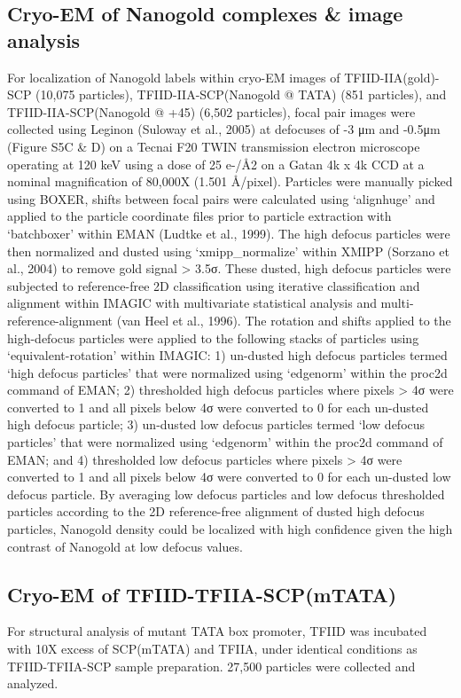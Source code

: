 \subsection{Cryo-EM of Nanogold complexes \& image analysis} 
For localization of Nanogold labels within cryo-EM images of TFIID-IIA(gold)-SCP (10,075 particles), TFIID-IIA-SCP(Nanogold @ TATA) (851 particles), and TFIID-IIA-SCP(Nanogold @ +45) (6,502 particles), focal pair images were collected using Leginon (Suloway et al., 2005) at defocuses of -3 μm and -0.5μm (Figure S5C & D) on a Tecnai F20 TWIN transmission electron microscope operating at 120 keV using a dose of 25 e-/Å2 on a Gatan 4k x 4k CCD at a nominal magnification of 80,000X (1.501 Å/pixel).  Particles were manually picked using BOXER, shifts between focal pairs were calculated using ‘alignhuge’ and applied to the particle coordinate files prior to particle extraction with ‘batchboxer’ within EMAN (Ludtke et al., 1999).  The high defocus particles were then normalized and dusted using ‘xmipp_normalize’ within XMIPP (Sorzano et al., 2004) to remove gold signal > 3.5σ.  These dusted, high defocus particles were subjected to reference-free 2D classification using iterative classification and alignment within IMAGIC with multivariate statistical analysis and multi-reference-alignment (van Heel et al., 1996).  The rotation and shifts applied to the high-defocus particles were applied to the following stacks of particles using ‘equivalent-rotation’ within IMAGIC:  1) un-dusted high defocus particles termed ‘high defocus particles’ that were normalized using ‘edgenorm’ within the proc2d command of EMAN; 2) thresholded high defocus particles where pixels > 4σ were converted to 1 and all pixels below 4σ were converted to 0 for each un-dusted high defocus particle; 3) un-dusted low defocus particles termed ‘low defocus particles’ that were normalized using ‘edgenorm’ within the proc2d command of EMAN; and 4) thresholded low defocus particles where pixels > 4σ were converted to 1 and all pixels below 4σ were converted to 0 for each un-dusted low defocus particle.  By averaging low defocus particles and low defocus thresholded particles according to the 2D reference-free alignment of dusted high defocus particles, Nanogold density could be localized with high confidence given the high contrast of Nanogold at low defocus values.

\subsection{Cryo-EM of TFIID-TFIIA-SCP(mTATA)}
For structural analysis of mutant TATA box promoter, TFIID was incubated with 10X excess of SCP(mTATA) and TFIIA, under identical conditions as TFIID-TFIIA-SCP sample preparation.  27,500 particles were collected and analyzed. 
